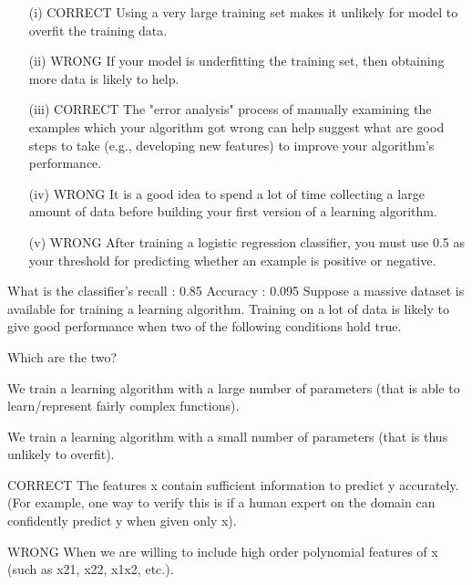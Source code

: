 \documentclass[11pt]{article} %
\begin{document}
\begin{itemize}
\item[(i)] CORRECT Using a very large training set makes it unlikely for model to overfit the training data.
	
	
\item[(ii)] 	WRONG If your model is underfitting the training set, then obtaining more data is likely to help.
	
\item[(iii)] 	CORRECT The "error analysis" process of manually examining the examples which your algorithm got wrong	can help suggest what are good steps to take (e.g., developing new features) to improve your algorithm's performance.
	
	
	
\item[(iv)]	WRONG It is a good idea to spend a lot of time collecting a large amount of data before building your first version of a learning algorithm.
	
	
	
\item[(v)] WRONG After training a logistic regression classifier, you must use 0.5 as your threshold for predicting whether an example is positive or	negative.
\end{itemize}


\newpage

What is the classifier's recall  : 0.85
Accuracy : 0.095
Suppose a massive dataset is available for training a learning algorithm. Training on a lot of data is likely to give good performance when two of the following conditions hold true.

Which are the two?


We train a learning algorithm with a large number of parameters (that is able to learn/represent fairly complex functions).

We train a learning algorithm with a small number of parameters (that is thus unlikely to overfit).

CORRECT The features x contain sufficient information to predict y accurately. (For example, one way to verify this is if a human expert on the domain can confidently predict y when given only x).

WRONG When we are willing to include high order polynomial features of x (such as x21, x22, x1x2, etc.).

\end{document}
